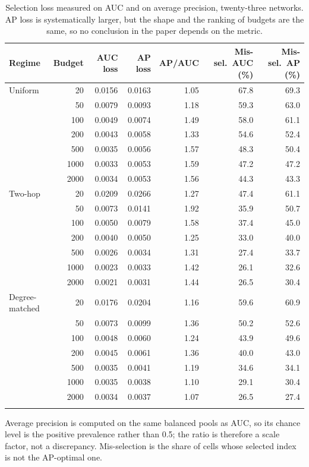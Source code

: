 \begin{table}[htbp]
\centering
\scriptsize
\caption{Selection loss measured on AUC and on average precision, twenty-three networks. AP loss is systematically larger, but the shape and the ranking of budgets are the same, so no conclusion in the paper depends on the metric.}
\label{tab:ap}
\begin{tabular}{l r r r r r r}
\toprule
Regime & Budget & AUC loss & AP loss & AP/AUC & Mis-sel.\ AUC (\%) & Mis-sel.\ AP (\%) \\
\midrule
Uniform & 20 & 0.0156 & 0.0163 & 1.05 & 67.8 & 69.3 \\
 & 50 & 0.0079 & 0.0093 & 1.18 & 59.3 & 63.0 \\
 & 100 & 0.0049 & 0.0074 & 1.49 & 58.0 & 61.1 \\
 & 200 & 0.0043 & 0.0058 & 1.33 & 54.6 & 52.4 \\
 & 500 & 0.0035 & 0.0056 & 1.57 & 48.3 & 50.4 \\
 & 1000 & 0.0033 & 0.0053 & 1.59 & 47.2 & 47.2 \\
 & 2000 & 0.0034 & 0.0053 & 1.56 & 44.3 & 43.3 \\
\addlinespace[2pt]
Two-hop & 20 & 0.0209 & 0.0266 & 1.27 & 47.4 & 61.1 \\
 & 50 & 0.0073 & 0.0141 & 1.92 & 35.9 & 50.7 \\
 & 100 & 0.0050 & 0.0079 & 1.58 & 37.4 & 45.0 \\
 & 200 & 0.0040 & 0.0050 & 1.25 & 33.0 & 40.0 \\
 & 500 & 0.0026 & 0.0034 & 1.31 & 27.4 & 33.7 \\
 & 1000 & 0.0023 & 0.0033 & 1.42 & 26.1 & 32.6 \\
 & 2000 & 0.0021 & 0.0031 & 1.44 & 26.5 & 30.4 \\
\addlinespace[2pt]
Degree-matched & 20 & 0.0176 & 0.0204 & 1.16 & 59.6 & 60.9 \\
 & 50 & 0.0073 & 0.0099 & 1.36 & 50.2 & 52.6 \\
 & 100 & 0.0048 & 0.0060 & 1.24 & 43.9 & 49.6 \\
 & 200 & 0.0045 & 0.0061 & 1.36 & 40.0 & 43.0 \\
 & 500 & 0.0035 & 0.0041 & 1.19 & 34.6 & 34.1 \\
 & 1000 & 0.0035 & 0.0038 & 1.10 & 29.1 & 30.4 \\
 & 2000 & 0.0034 & 0.0037 & 1.07 & 26.5 & 27.4 \\
\addlinespace[2pt]
\bottomrule
\end{tabular}
\par\vspace{2pt}\begin{minipage}{\linewidth}\footnotesize Average precision is computed on the same balanced pools as AUC, so its chance level is the positive prevalence rather than 0.5; the ratio is therefore a scale factor, not a discrepancy. Mis-selection is the share of cells whose selected index is not the AP-optimal one.\end{minipage}
\end{table}
